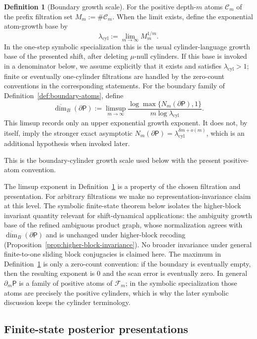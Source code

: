 \documentclass{etds}%
\numberwithin{equation}{section}
\theoremstyle{plain}
\theoremstyle{definition}
\newtheorem{definition}[theorem]{Definition}
\theoremstyle{remark}
\begin{document}
\begin{definition}[Boundary growth scale]
\label{def:boundary-cylinder}
For the positive depth-$m$ atoms $\mathcal{C}_m$ of the prefix filtration set
$M_m:=\#\mathcal{C}_m$.  When the limit exists, define the exponential
atom-growth base by
\[
\lambda_{\mathrm{cyl}}
:=\lim_{m\to\infty} M_m^{1/m}.
\]
In the one-step symbolic specialization this is the usual cylinder-language
growth base of the presented shift, after deleting $\mu$-null cylinders.  If
this base is invoked in a denominator below, we assume explicitly that it
exists and satisfies $\lambda_{\mathrm{cyl}}>1$; finite or eventually
one-cylinder filtrations are handled by the zero-count conventions in the
corresponding statements.  For the boundary family of
Definition~\ref{def:boundary-atoms}, define
\[
\overline{\dim}_B(\partial\mathsf{P})
:=\limsup_{m\to\infty}
\frac{\log \max\{N_m(\partial\mathsf{P}),1\}}{m\log\lambda_{\mathrm{cyl}}}.
\]
This limsup records only an upper exponential growth exponent.  It does not,
by itself, imply the stronger exact asymptotic
$N_m(\partial\mathsf{P})=\lambda_{\mathrm{cyl}}^{\delta m+o(m)}$, which is an
additional hypothesis when invoked later.
\end{definition}

This is the boundary-cylinder growth scale used below with the present
positive-atom convention.

The limsup exponent in Definition~\ref{def:boundary-cylinder} is a property of
the chosen filtration and presentation.  For arbitrary filtrations we make no
representation-invariance claim at this level.  The symbolic finite-state
theorem below isolates the higher-block invariant quantity relevant for
shift-dynamical
applications: the ambiguity growth base of the refined ambiguous product
graph, whose
normalization agrees with
$\overline{\dim}_B(\partial\mathsf{P})$ and is unchanged under higher-block
recoding (Proposition~\ref{prop:higher-block-invariance}).  No broader
invariance under general finite-to-one sliding block conjugacies is claimed
here.  The maximum in Definition~\ref{def:boundary-cylinder} is only a
zero-count convention: if the boundary is eventually empty, then the resulting
exponent is $0$ and the scan error is eventually zero.
In general $\partial_m\mathsf{P}$ is a family of positive atoms of
$\mathcal{F}_m$; in the symbolic specialization those atoms are precisely the
positive cylinders, which is why the later symbolic discussion keeps the
cylinder terminology.

\subsection{Finite-state posterior presentations}
\label{sub:finite-posterior}
\end{document}
